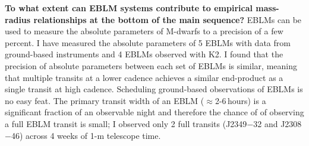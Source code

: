 \noindent \textbf{To what extent can EBLM systems contribute to empirical mass-radius relationships at the bottom of the main sequence? } EBLMs can be used to measure the absolute parameters of M-dwarfs to a precision of a few percent. I have measured the absolute parameters of 5 EBLMs with data from ground-based instruments and 4 EBLMs observed with K2. I found that the precision of absolute parameters between each set of EBLMs is similar, meaning that multiple transits at a lower cadence achieves a similar end-product as a single transit at high cadence. Scheduling ground-based observations of EBLMs is no easy feat. The primary transit width of an EBLM ($\approx$2-6\,hours) is a significant fraction of an observable night and therefore the chance of of observing a full EBLM transit is small; I observed only 2 full transits (J2349$-$32 and J2308$-$46) across 4 weeks of 1-m telescope time. 




